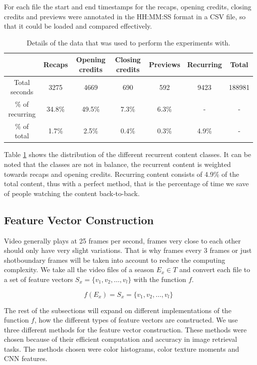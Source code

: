 \documentclass{article}
\begin{document}
For each file the start and end timestamps for the recaps, opening credits, closing credits and previews were annotated in the HH:MM:SS format in a CSV file, so that it could be loaded and compared effectively.

\begin{table}[h]
	\begin{adjustwidth}{-.5in}{-.5in}  
	\begin{center}
		\begin{tabular}{ c | c c c c c c} 
				& Recaps	& Opening credits	& Closing credits	& Previews	& Recurring	& Total \\
			\hline
			Total seconds 	& 3275	& 4669	& 690	& 592	& 9423	& 188981 \\
			\% of recurring	& 34.8\%& 49.5\%& 7.3\% & 6.3\% & -		& - \\
			\% of total 	& 1.7\%	& 2.5\%	& 0.4\%	& 0.3\%	& 4.9\%	& - \\
		\end{tabular}
	\end{center}
	\end{adjustwidth}
	\caption{Details of the data that was used to perform the experiments with.}
	\label{table:datastatistics}
\end{table}

Table \ref{table:datastatistics} shows the distribution of the different recurrent content classes. It can be noted that the classes are not in balance, the recurrent content is weighted towards recaps and opening credits. Recurring content consists of 4.9\% of the total content, thus with a perfect method, that is the percentage of time we save of people watching the content back-to-back.

\subsection{Feature Vector Construction}
Video generally plays at 25 frames per second, frames very close to each other should only have very slight variations. That is why frames every 3 frames or just shotboundary frames will be taken into account to reduce the computing complexity. We take all the video files of a season $E_x \in T$ and convert each file to a set of feature vectors $S_x = \{v_1, v_2, \dots, v_l\}$ with the function $f$.

\[f(E_x) = S_x = \{v_1, v_2, \dots, v_l\}\]

The rest of the subsections will expand on different implementations of the function $f$, how the different types of feature vectors are constructed. We use three different methods for the feature vector construction. These methods were chosen because of their efficient computation and accuracy in image retrieval tasks. The methods chosen were color histograms, color texture moments and CNN features.
\end{document}
